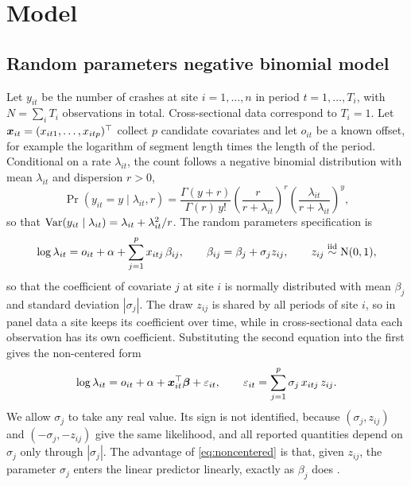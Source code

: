 \section{Model}\label{sec:model}

\subsection{Random parameters negative binomial model}\label{sec:rpnb}

Let $y_{it}$ be the number of crashes at site $i=1,\dots,n$ in period $t=1,\dots,T_i$, with $N=\sum_i T_i$ observations in total. Cross-sectional data correspond to $T_i=1$. Let $\bm{x}_{it}=(x_{it1},\dots,x_{itp})^\top$ collect $p$ candidate covariates and let $o_{it}$ be a known offset, for example the logarithm of segment length times the length of the period. Conditional on a rate $\lambda_{it}$, the count follows a negative binomial distribution with mean $\lambda_{it}$ and dispersion $r>0$,
\begin{equation}\label{eq:nb}
\Pr(y_{it}=y \mid \lambda_{it}, r)=\frac{\Gamma(y+r)}{\Gamma(r)\,y!}\left(\frac{r}{r+\lambda_{it}}\right)^{r}\left(\frac{\lambda_{it}}{r+\lambda_{it}}\right)^{y},
\end{equation}
so that $\operatorname{Var}(y_{it}\mid\lambda_{it})=\lambda_{it}+\lambda_{it}^2/r$.
The random parameters specification is
\begin{equation}\label{eq:rp}
\log\lambda_{it}=o_{it}+\alpha+\sum_{j=1}^{p}x_{itj}\,\beta_{ij},
\qquad \beta_{ij}=\beta_j+\sigma_j z_{ij},
\qquad z_{ij}\overset{\text{iid}}{\sim}\mathrm{N}(0,1),
\end{equation}
so that the coefficient of covariate $j$ at site $i$ is normally distributed with mean $\beta_j$ and standard deviation $|\sigma_j|$. The draw $z_{ij}$ is shared by all periods of site $i$, so in panel data a site keeps its coefficient over time, while in cross-sectional data each observation has its own coefficient. Substituting the second equation into the first gives the non-centered form
\begin{equation}\label{eq:noncentered}
\log\lambda_{it}=o_{it}+\alpha+\bm{x}_{it}^\top\bm{\beta}+\varepsilon_{it},
\qquad \varepsilon_{it}=\sum_{j=1}^{p}\sigma_j\,x_{itj}\,z_{ij}.
\end{equation}
We allow $\sigma_j$ to take any real value. Its sign is not identified, because $(\sigma_j,z_{ij})$ and $(-\sigma_j,-z_{ij})$ give the same likelihood, and all reported quantities depend on $\sigma_j$ only through $|\sigma_j|$. The advantage of \eqref{eq:noncentered} is that, given $z_{ij}$, the parameter $\sigma_j$ enters the linear predictor linearly, exactly as $\beta_j$ does \citep{papaspiliopoulos2007general, fruhwirth2010stochastic}.

